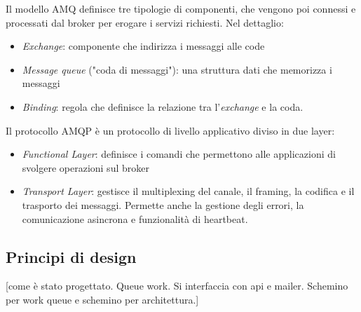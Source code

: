 Il modello AMQ definisce tre tipologie di componenti, che vengono poi connessi e processati dal broker per erogare i servizi richiesti.
Nel dettaglio:
\begin{itemize}
    \item \textit{Exchange}: componente che indirizza i messaggi alle code
    \item \textit{Message queue} ("coda di messaggi"): una struttura dati che memorizza i messaggi
    \item \textit{Binding}: regola che definisce la relazione tra l'\textit{exchange} e la coda.
\end{itemize}

Il protocollo AMQP è un protocollo di livello applicativo diviso in due layer:
\begin{itemize}
    \item \textit{Functional Layer}: definisce i comandi che permettono alle applicazioni di svolgere operazioni sul broker
    \item \textit{Transport Layer}:  gestisce il multiplexing del canale, il framing, la codifica e il trasporto dei messaggi. Permette anche la gestione degli errori, la comunicazione asincrona e funzionalità di heartbeat.
\end{itemize}







\subsection{Principi di design}
[come è stato progettato. Queue work. Si interfaccia con api e mailer. Schemino per work queue e schemino per architettura.]


